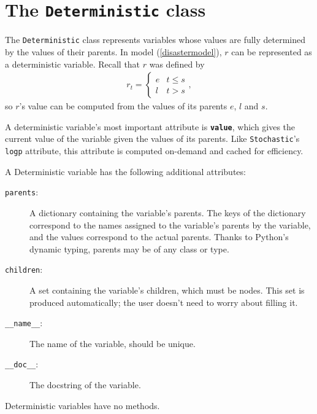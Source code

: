 \section{The \texttt{Deterministic} class}\label{deterministic}

The \texttt{Deterministic} class represents variables whose values are fully determined by the values of their parents. In model (\ref{disastermodel}), $r$ can be represented as a deterministic variable. Recall that $r$ was defined by
\begin{eqnarray*}
    r_t=\left\{\begin{array}{ll}
        e & t\le s\\ l & t>s
        \end{array}\right.,
\end{eqnarray*}
so $r$'s value can be computed from the values of its parents $e$, $l$ and $s$.

A deterministic variable's most important attribute is \texttt{\bfseries value}, which gives the current value of the variable given the values of its parents. Like \texttt{Stochastic}'s \texttt{logp} attribute, this attribute is computed on-demand and cached for efficiency.

A Deterministic variable has the following additional attributes:
\begin{description}
    \item[\texttt{parents}:] A dictionary containing the variable's parents. The keys of the dictionary correspond to the names assigned to the variable's parents by the variable, and the values correspond to the actual parents. Thanks to Python's dynamic typing, parents may be of any class or type.
    \item[\texttt{children}:] A set containing the variable's children, which must be nodes. This set is produced automatically; the user doesn't need to worry about filling it.
    \item[\texttt{__name__}:] The name of the variable, should be unique.
    \item[\texttt{__doc__}:] The docstring of the variable.
\end{description}
Deterministic variables have no methods.


